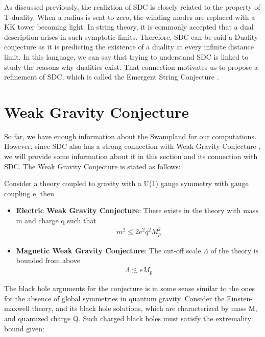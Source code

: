 \indent As discussed previously, the realiztion of SDC is closely related to the property of T-duality. When a radius is sent to zero, the winding modes are replaced with a KK tower becoming light. In string theory, it is commonly accepted that a dual description arises in such symptotic limits. Therefore, SDC can be said a Duality conjecture as it is predicting the existence of a duality at every infinite distance limit. In this language, we can say that trying to understand SDC is linked to study the reasons why dualities exist. That connection motivates us to propose a refinement of SDC, which is called the Emergent String Conjecture \parencite{lee_emergent_2022}. 

\section{Weak Gravity Conjecture}
So far, we have enough information about the Swampland for our computations. However, since SDC also has a strong connection with Weak Gravity Conjecture \parencite{arkani-hamed_string_2007}, we will provide some information about it in this section and its connection with SDC. The Weak Gravity Conjecture is stated as follows:
\begin{tcolorbox}[title=Weak Gravity Conjecture,
    title filled=false,
    colback=blue!5!white,
    colframe=blue!75!black]
    Consider a theory coupled to gravity with a U(1) gauge symmetry with gauge coupling e, then
    \begin{itemize}
        \item {\textbf{Electric Weak Gravity Conjecture}: There exists in the theory with mass m and charge q such that
        \begin{align}
            \label{eq:ewgc}
            m^{2} \leq 2e^{2} q^{2} M_{p}^{2}
        \end{align}
        }
        \item {\textbf{Magnetic Weak Gravity Conjecture}: The cut-off scale $\Lambda$ of the theory is bounded from above
        \begin{align}
            \label{eq:mwgc}
            \Lambda \lesssim eM_{p}
        \end{align}}
    \end{itemize}
\end{tcolorbox}
The black hole arguments for the conjecture is in some sense similar to the ones for the absence of global symmetries in quantum gravity. Consider the Einsten-maxwell theory, and its black hole solutions, which are characterized by mass M, and quantized charge Q. Such charged black holes must satisfy the extremality bound given:
